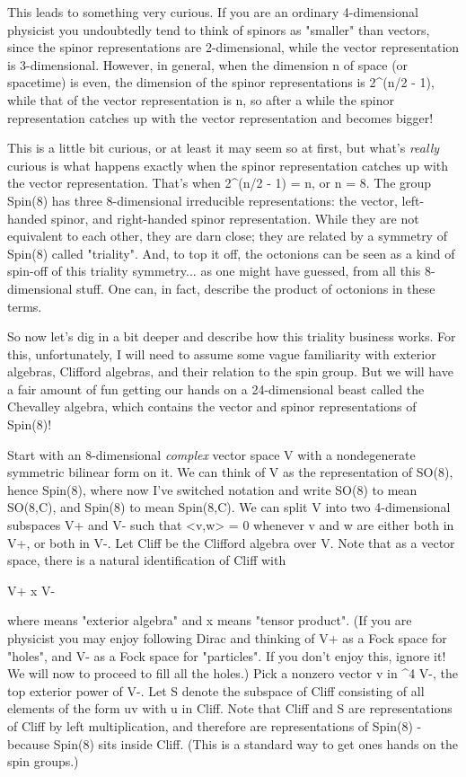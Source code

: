 This leads to something very curious.  If you are an ordinary
4-dimensional physicist you undoubtedly tend to think of spinors as
"smaller" than vectors, since the spinor representations are
2-dimensional, while the vector representation is 3-dimensional.
However, in general, when the dimension n of space (or spacetime) is
even, the dimension of the spinor representations is 2^(n/2 - 1),
while that of the vector representation is n, so after a while
the spinor representation catches up with the vector representation
and becomes bigger!

This is a little bit curious, or at least it may seem so at first, but
what's \emph{really} curious is what happens exactly when the spinor
representation catches up with the vector representation.  That's when
2^(n/2 - 1) = n, or n = 8.  The group Spin(8) has three 8-dimensional
irreducible representations: the vector, left-handed spinor, and
right-handed spinor representation.  While they are not equivalent to
each other, they are darn close; they are related by a symmetry of
Spin(8) called "triality".  And, to top it off, the octonions can be
seen as a kind of spin-off of this triality symmetry...  as one might
have guessed, from all this 8-dimensional stuff.  One can, in fact,
describe the product of octonions in these terms.

So now let's dig in a bit deeper and describe how this triality
business works.  For this, unfortunately, I will need to assume some
vague familiarity with exterior algebras, Clifford algebras, and their 
relation to the spin group.  But we will have a fair amount of fun
getting our hands on a 24-dimensional beast called the Chevalley algebra,
which contains the vector and spinor representations of Spin(8)!

Start with an 8-dimensional \emph{complex} vector space V with a
nondegenerate symmetric bilinear form on it.  We can think of V as the
representation of SO(8), hence Spin(8), where now I've switched
notation and write SO(8) to mean SO(8,C), and Spin(8) to mean
Spin(8,C).  We can split V into two 4-dimensional subspaces V+ and V-
such that <v,w> = 0 whenever v and w are either both in V+, or both in
V-.  Let Cliff be the Clifford algebra over V.  Note that as a vector
space, there is a natural identification of Cliff with

\Lambda  V+ x \Lambda  V-

where \Lambda  means "exterior algebra" and x means "tensor product".
(If you are physicist you may enjoy following Dirac and thinking of
\Lambda  V+ as a Fock space for "holes", and \Lambda  V- as a Fock space
for "particles".  If you don't enjoy this, ignore it!  We will now
to proceed to fill all the holes.)  Pick a nonzero vector v in
\Lambda ^4 V-, the top exterior power of V-.  Let S denote the subspace
of Cliff consisting of all elements of the form uv with u in Cliff.
Note that Cliff and S are representations of Cliff by left
multiplication, and therefore are representations of Spin(8) - 
because Spin(8) sits inside Cliff.  (This is a standard way to get
ones hands on the spin groups.)

